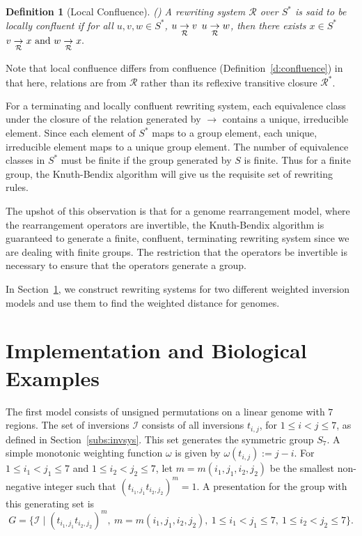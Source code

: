 \documentclass[12pt,a4paper]{amsart}
\newcommand{\invset}{\mathcal{I}}
\newcommand{\rws}{\mathcal{R}}
\newcommand{\writesto}{\rightarrow}
\newcommand{\writestoc}[1]{\underset{\mathclap{#1}}{\rightarrow}}
\numberwithin{equation}{section}
\newtheorem{definition}[prop]{Definition}
\begin{document}
\begin{definition}[Local Confluence](\cite{baader1999term})
A rewriting system $\rws$ over $S^*$ is said to be \emph{locally confluent}  if 
 for all  $u,v, w \in S^*$, 
$u \writestoc{\rws} v$  
$u \writestoc{\rws} w$,
{ then there exists }
$ x \in S^*$  $v \writestoc{\rws} x \mbox{ and } w \writestoc{\rws} x.$
\end{definition}

Note that local confluence differs from confluence (Definition~\ref{d:confluence}) in that here, relations are from $\rws$ rather than its reflexive transitive closure $\rws^*$.


For a terminating and locally confluent rewriting system,  each equivalence class under the closure of the relation generated by $\writesto$ contains a unique, irreducible element.  
%
Since each element of $S^*$ maps to a group element, each unique, irreducible element maps to a unique group element. The number of equivalence classes in $S^*$ must be finite if the group generated by $S$ is finite. Thus for a finite group, the Knuth-Bendix algorithm will give us the requisite set of rewriting rules. 

The upshot of this observation is that for a genome rearrangement model, where the rearrangement operators are invertible, the Knuth-Bendix algorithm is guaranteed to generate a finite, confluent, terminating  rewriting system since we are dealing with finite groups. The restriction that the operators be invertible is necessary to ensure that the operators generate a group. 

In Section~\ref{sec:examples}, we construct rewriting systems for two different weighted inversion models and use them to find the weighted distance for genomes. 

\section{Implementation and Biological Examples}
\label{sec:examples}
The first model consists of unsigned permutations on a linear genome with $7$ regions. The set of inversions $\invset$ consists of all inversions $t_{i,j}$, for $1 \leq i < j \leq 7$, as defined in Section~\ref{subs:invsys}. This set generates the symmetric group $S_7$. A simple monotonic weighting function $\omega$ is given by $\omega(t_{i,j}) := j - i$.
For $1\leq i_1 < j_1\leq 7$ and  $1\leq i_2 < j_2\leq 7$, let $m=m(i_1, j_1, i_2, j_2)$ be the smallest non-negative integer such that $(t_{i_1,j_1} t_{i_2,j_2})^m = 1$.
 A presentation for the group with this generating set is
\[
G = \{ \invset \mid (t_{i_1,j_1}t_{i_2,j_2})^{m},\ m=m(i_1, j_1, i_2, j_2),\ 1\le i_1 < j_1 \le 7,\ 1\le i_2 < j_2 \le 7 \}.
\]
\end{document}
